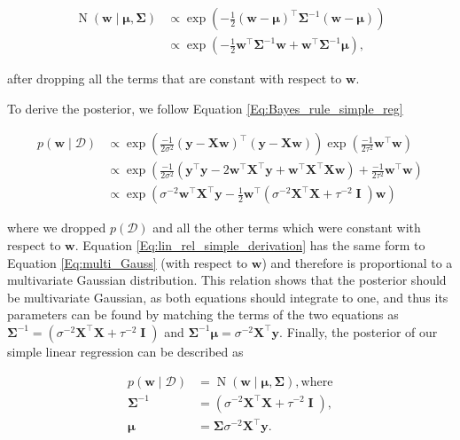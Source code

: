 \documentclass[dissertation,math,vertlayout,pdfa,colorlinks]{aaltoseries}
\newcommand{\bw}{\bm{w}}
\newcommand{\bX}{\bm{X}}
\newcommand{\by}{\bm{y}}
\newcommand{\bD}{\mathcal{D}}
\DeclareMathOperator{\eye}{\textbf{I}}
\DeclareMathOperator{\normalpdf}{N}
\newcommand{\tp}{^{\top}}
\begin{document}
\begin{align}\label{Eq:multi_Gauss}
\normalpdf(\bw \mid \bm{\mu},\bm{\Sigma}) &\propto \exp \left (-\frac{1}{2}(\bw - \bm{\mu})\tp\bm{\Sigma}^{-1}(\bw - \bm{\mu}) \right) \nonumber\\
&\propto \exp \left ( -\frac{1}{2}\bw\tp\bm{\Sigma}^{-1}\bw +  \bw\tp\bm{\Sigma}^{-1}\bm{\mu} \right),
\end{align}

\noindent after dropping all the terms that are constant with respect to $\bw$. 

To derive the posterior, we follow Equation \ref{Eq:Bayes_rule_simple_reg} 

\begin{align} \label{Eq:lin_rel_simple_derivation}
p(\bw \mid \bD) &\propto \exp \left(\frac{-1}{2\sigma^2} (\by - \bX \bw)\tp(\by - \bX \bw)\right) \exp(\frac{-1}{2\tau^2}\bw\tp\bw) \nonumber\\ 
&\propto \exp \left (\frac{-1}{2\sigma^2}(\by\tp\by - 2\bw\tp\bX\tp\by + \bw\tp\bX\tp\bX\bw)+ \frac{-1}{2\tau^2}\bw\tp\bw \right) \nonumber\\
&\propto \exp \left ( \sigma^{-2}\bw\tp\bX\tp\by -\frac{1}{2} \bw\tp( \sigma^{-2}\bX\tp\bX + \tau^{-2} \eye )\bw \right) %
\end{align}    
 
\noindent where we dropped $p(\bD)$ and all the other terms which were constant with respect to $\bw$. Equation \ref{Eq:lin_rel_simple_derivation} has the same form to Equation \ref{Eq:multi_Gauss} (with respect to $\bw$) and therefore is proportional to a multivariate Gaussian distribution. This relation shows that the posterior should be multivariate Gaussian, as both equations should integrate to one, and thus its parameters can be found by matching the terms of the two equations as $\bm{\Sigma}^{-1} = ( \sigma^{-2}\bX\tp\bX + \tau^{-2} \eye ) $ and $\bm{\Sigma}^{-1}\bm{\mu} = \sigma^{-2}\bX\tp\by$. Finally, the posterior of our simple linear regression can be described as 

\begin{align}\label{Eq:lin_rel_simple_posterior}
	p(\bw \mid \bD) &= \normalpdf(\bw \mid \bm{\mu},\bm{\Sigma}), \text{where}\\
	\bm{\Sigma}^{-1} &= (\sigma^{-2}\bX\tp\bX + \tau^{-2} \eye ), \nonumber\\
	\bm{\mu} &= \bm{\Sigma}\sigma^{-2}\bX\tp\by. \nonumber
\end{align}
\end{document}
